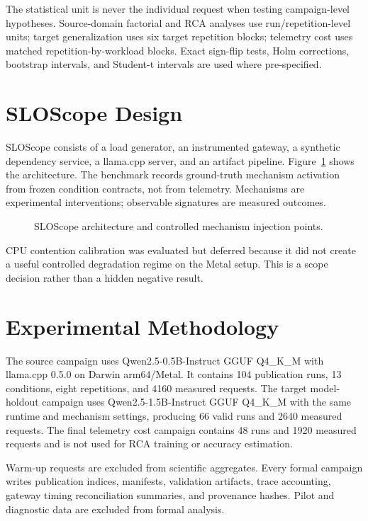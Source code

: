 \documentclass[11pt]{article}
\begin{document}
The statistical unit is never the individual request when testing campaign-level hypotheses. Source-domain factorial and RCA analyses use run/repetition-level units; target generalization uses six target repetition blocks; telemetry cost uses matched repetition-by-workload blocks. Exact sign-flip tests, Holm corrections, bootstrap intervals, and Student-t intervals are used where pre-specified.

\section{SLOScope Design}
SLOScope consists of a load generator, an instrumented gateway, a synthetic dependency service, a llama.cpp server, and an artifact pipeline. Figure~\ref{fig:architecture} shows the architecture. The benchmark records ground-truth mechanism activation from frozen condition contracts, not from telemetry. Mechanisms are experimental interventions; observable signatures are measured outcomes.

\begin{figure}[t]
\centering
{}
\caption{SLOScope architecture and controlled mechanism injection points.}
\label{fig:architecture}
\end{figure}




CPU contention calibration was evaluated but deferred because it did not create a useful controlled degradation regime on the Metal setup. This is a scope decision rather than a hidden negative result.

\section{Experimental Methodology}
The source campaign uses Qwen2.5-0.5B-Instruct GGUF Q4\_K\_M with llama.cpp 0.5.0 on Darwin arm64/Metal. It contains 104 publication runs, 13 conditions, eight repetitions, and 4160 measured requests. The target model-holdout campaign uses Qwen2.5-1.5B-Instruct GGUF Q4\_K\_M with the same runtime and mechanism settings, producing 66 valid runs and 2640 measured requests. The final telemetry cost campaign contains 48 runs and 1920 measured requests and is not used for RCA training or accuracy estimation.

Warm-up requests are excluded from scientific aggregates. Every formal campaign writes publication indices, manifests, validation artifacts, trace accounting, gateway timing reconciliation summaries, and provenance hashes. Pilot and diagnostic data are excluded from formal analysis.
\end{document}
